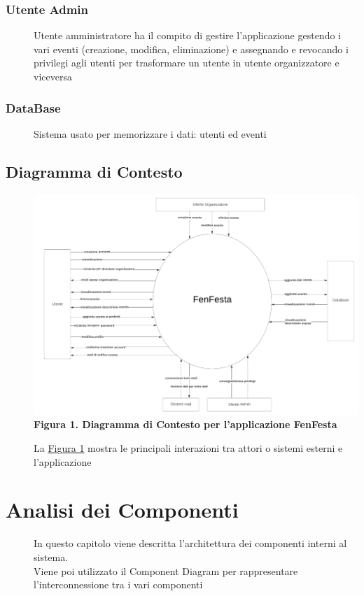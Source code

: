 \documentclass{article}
\begin{document}
\subsubsection{Utente Admin}
\begin{description}
    \item[] Utente amministratore ha il compito di gestire l'applicazione gestendo i vari eventi (creazione, modifica, eliminazione) e assegnando e revocando i privilegi agli utenti per trasformare un utente in utente organizzatore e viceversa
\end{description}
\subsubsection{DataBase}
\begin{description}
    \item[] Sistema usato per memorizzare i dati: utenti ed eventi
\end{description}
\subsection{Diagramma di Contesto}
\begin{description}
    \item[] \includegraphics[scale=0.5]{Context.png} \\
        \textbf{Figura 1. Diagramma di Contesto per l'applicazione FenFesta} \label{fig:1}
    \item[] La \hyperref[fig:1]{Figura 1} mostra le principali interazioni tra attori o sistemi esterni e l'applicazione
\end{description}
\clearpage
\section{Analisi dei Componenti}
\begin{description}
    \item[] In questo capitolo viene descritta l'architettura dei componenti interni al sistema. \\
        Viene poi utilizzato il Component Diagram per rappresentare l'interconnessione tra i vari componenti
\end{description}
\end{document}
